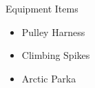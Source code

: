 \begin{equipment}{Equipment Items}
    \begin{itemize}
        \item Pulley Harness
        \item Climbing Spikes
        \item Arctic Parka
    \end{itemize}
\end{equipment}

